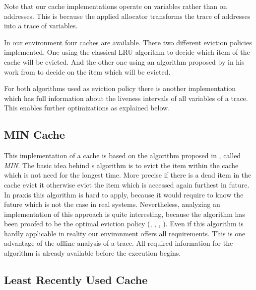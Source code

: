 \documentclass[onecolumn, openright, master, english, signatures]{dbrgrptt}
\begin{document}
\begin{remark}
Note that our cache implementations operate on variables rather than on addresses. This is because the applied allocator transforms the \ac{trace} of addresses into a \ac{trace} of variables.
\end{remark}

In our environment four caches are available. There two different eviction policies implemented. One using the classical \ac{LRU} algorithm to decide which item of the cache will be evicted. And the other one using an algorithm proposed by  in his work \cite{belady1966study} from \citeyear{belady1966study} to decide on the item which will be evicted.

For both algorithms used as eviction policy there is another implementation which has full information about the liveness intervals of all variables of a \ac{trace}. This enables further optimizations as explained below.

\subsection{MIN Cache}\label{ssec:cache-MIN}

This implementation of a cache is based on the algorithm proposed in \cite{belady1966study}, called \emph{\ac{MIN}}. The basic idea behind \citeauthor{belady1966study}s algorithm is to evict the item within the cache which is not need for the longest time. More precise if there is a dead item in the cache evict it otherwise evict the item which is accessed again furthest in future. In praxis this algorithm is hard to apply, because it would require to know the future which is not the case in real systems. Nevertheless, analyzing an implementation of this approach is quite interesting, because the algorithm has been proofed to be the optimal eviction policy (\cite{mattson1970evaluation}, \cite{van2007short}, \cite{vogler2008another}, \cite{lee2016simple}). Even if this algorithm is hardly applicable in reality our environment offers all requirements. This is one advantage of the offline analysis of a \ac{trace}. All required information for the \citeauthor{belady1966study} algorithm is already available before the execution begins.

\subsection{Least Recently Used Cache}\label{ssec:cache-lru}
\end{document}
